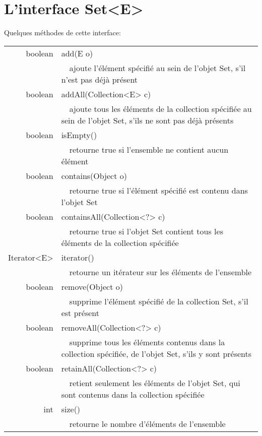 \documentclass[iutinfo,a4paper,nocorrections,10pt]{ustl-tdtp}
\date{\annee{2018}--\annee{2019}}
\begin{document}
\maketitle
\thispagestyle{empty}


\section{L'interface Set<E>}

Quelques méthodes de cette interface:

\begin{center}
\begin{tabular}{|r|l|}
\hline
boolean & add(E o)\\
&~~ajoute l'élément spécifié au sein de l'objet Set, s'il n'est pas déjà présent\\

\hline
boolean & addAll(Collection<E> c)\\
&~~ajoute tous les éléments de la collection spécifiée au sein de l'objet Set, s'ils ne sont pas déjà présents\\

\hline
  boolean &isEmpty()\\
&~~retourne true si l'ensemble ne contient aucun élément\\

 \hline
 boolean& contains(Object o)\\
&~~retourne true si l'élément spécifié est contenu dans l'objet Set\\

\hline
 boolean &containsAll(Collection<?> c)\\
&~~retourne true si l'objet Set contient tous les éléments de la collection spécifiée\\

\hline
 Iterator<E> & iterator()\\
&~~retourne un itérateur sur les éléments de l'ensemble\\
\hline
 boolean &remove(Object o)\\
&~~supprime l'élément spécifié de la collection Set, s'il est présent\\

\hline
 boolean &removeAll(Collection<?> c)\\
&~~supprime tous les éléments contenus dans la collection spécifiée, de l'objet Set, s'ils y sont présents\\
\hline
 boolean &retainAll(Collection<?> c)\\
&~~retient seulement les éléments de l'objet Set, qui sont contenus dans la collection spécifiée\\
\hline
 int& size()\\
&~~retourne le nombre d'éléments de l'ensemble\\

\hline
\end{tabular}
\end{center}
\end{document}
